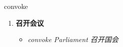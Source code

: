 
\begin{frame}
{\huge convoke}
\begin{center}
\begin{enumerate}\Large
  \item \textbf{召开会议}
  \begin{itemize}
    \item \em{\Large{convoke Parliament 召开国会}}
  \end{itemize}
\end{enumerate}
\end{center}
\end{frame}
